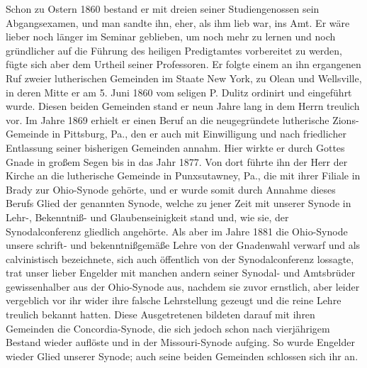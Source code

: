 Schon zu Ostern 1860 bestand er mit dreien seiner Studiengenossen sein Abgangsexamen, und man sandte ihn, eher, als ihm lieb war, ins Amt. Er wäre lieber noch länger im Seminar geblieben, um noch mehr zu lernen und noch gründlicher auf die Führung des heiligen Predigtamtes vorbereitet zu werden, fügte sich aber dem Urtheil seiner Professoren. Er folgte einem an ihn ergangenen Ruf zweier lutherischen Gemeinden im Staate New York, zu Olean und Wellsville, in deren Mitte er am 5. Juni 1860 vom seligen P. Dulitz ordinirt und eingeführt wurde. Diesen beiden Gemeinden stand er neun Jahre lang in dem Herrn treulich vor. Im Jahre 1869 erhielt er einen Beruf an die neugegründete lutherische Zions-Gemeinde in Pittsburg, Pa., den er auch mit Einwilligung und nach friedlicher Entlassung seiner bisherigen Gemeinden annahm. Hier wirkte er durch Gottes Gnade in großem Segen bis in das Jahr 1877. Von dort führte ihn der Herr der Kirche an die lutherische Gemeinde in Punxsutawney, Pa., die mit ihrer Filiale in Brady zur Ohio-Synode gehörte, und er wurde somit durch Annahme dieses Berufs Glied der genannten Synode, welche zu jener Zeit mit unserer Synode in Lehr-, Bekenntniß- und Glaubenseinigkeit stand und, wie sie, der Synodalconferenz gliedlich angehörte. Als aber im Jahre 1881 die Ohio-Synode unsere schrift- und bekenntnißgemäße Lehre von der Gnadenwahl verwarf und als calvinistisch bezeichnete, sich auch öffentlich von der Synodalconferenz lossagte, trat unser lieber Engelder mit manchen andern seiner Synodal- und Amtsbrüder gewissenhalber aus der
Ohio-Synode aus, nachdem sie zuvor ernstlich, aber leider vergeblich vor ihr wider ihre falsche Lehrstellung gezeugt und die reine Lehre treulich bekannt hatten. Diese Ausgetretenen bildeten darauf mit ihren Gemeinden die Concordia-Synode, die sich jedoch schon nach vierjährigem Bestand wieder auflöste und in der Missouri-Synode aufging. So wurde Engelder wieder Glied unserer Synode; auch seine beiden Gemeinden schlossen sich ihr an.

